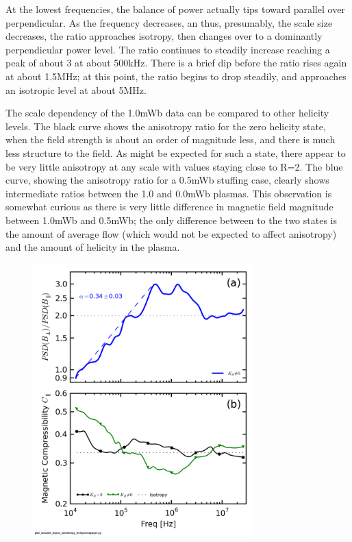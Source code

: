 \documentclass[aip,prl,amsmath,amssymb,reprint,superscriptaddress]{revtex4-1} %
\begin{document}
At the lowest frequencies, the balance of power actually tips toward parallel over perpendicular. As the frequency decreases, an thus, presumably, the scale size decreases, the ratio approaches isotropy, then changes over to a dominantly perpendicular power level. The ratio continues to steadily increase reaching a peak of about 3 at about 500kHz. There is a brief dip before the ratio rises again at about 1.5MHz; at this point, the ratio begins to drop steadily, and approaches an isotropic level at about 5MHz. 

The scale dependency of the 1.0mWb data can be compared to other helicity levels. The black curve shows the anisotropy ratio for the zero helicity state, when the field strength is about an order of magnitude less, and there is much less structure to the field. As might be expected for such a state, there appear to be very little anisotropy at any scale with values staying close to R=2. The blue curve, showing the anisotropy ratio for a 0.5mWb stuffing case, clearly shows intermediate ratios between the 1.0 and 0.0mWb plasmas. This observation is somewhat curious as there is very little difference in magnetic field magnitude between 1.0mWb and 0.5mWb; the only difference between to the two states is the amount of average flow (which would not be expected to affect anisotropy) and the amount of helicity in the plasma.

\begin{figure}[!htbp]
\centerline{
\includegraphics[width=8.5cm]{mag_compressibility_0helchan1t4prelim_1helchan1t6Kiydef_wratio_wfit}}
\caption{\label{fig:fitratio}}
\end{figure}
\end{document}
